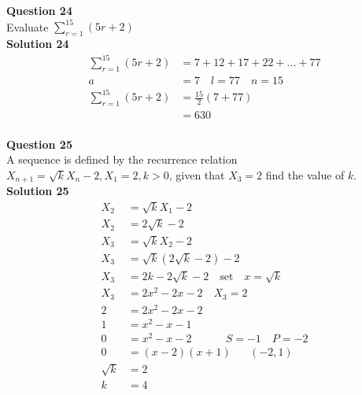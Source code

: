 \documentclass{article}
\begin{document}
\noindent\textbf{Question 24}\\[5pt]
Evaluate $\displaystyle\sum_{r=1}^{15} (5r+2)$\\[5pt]
\noindent\textbf{Solution 24}\\[5pt]
\begin{align*}
\displaystyle\sum_{r=1}^{15} (5r+2)&=7+12+17+22+...+77\\[2pt]
a&=7\quad l=77 \quad n=15\\[2pt]
\displaystyle\sum_{r=1}^{15} (5r+2)&=\displaystyle\frac{15}{2}(7+77)\\[2pt]
&=630
\end{align*}\\[10pt]

\noindent\textbf{Question 25}\\[5pt]
A sequence is defined by the recurrence relation $X_{n+1}=\sqrt{k}X_n-2, X_1=2,k>0$, given that $X_3=2$ find the value of $k$.\\[5pt]
\noindent\textbf{Solution 25}\\[5pt]
\begin{align*}
X_2&=\sqrt{k}X_1-2\\[2pt]
X_2&=2\sqrt{k}-2\\[12pt]
X_3&=\sqrt{k}X_2-2\\[2pt]
X_3&=\sqrt{k}(2\sqrt{k}-2)-2\\[2pt]
X_3&=2k-2\sqrt{k}-2\quad \text{set}\quad x=\sqrt{k}\\[2pt]
X_3&=2x^2-2x-2 \quad X_3=2\\[2pt]
2&=2x^2-2x-2\\[2pt]
1&=x^2-x-1\\[2pt]
0&=x^2-x-2 \hspace{37pt} S=-1 \quad P=-2\\[2pt]
0&=(x-2)(x+1)\hspace{20pt} (-2,1)\\[2pt]
\sqrt{k}&=2\\[2pt]
k&=4
\end{align*}\\[10pt]
\end{document}
